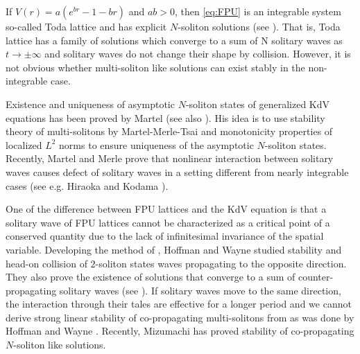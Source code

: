 \documentclass[11pt]{amsart}
\theoremstyle{remark}
\numberwithin{equation}{section}
\begin{document}
\par
If $V(r)=a(e^{br}-1-br)$ and $ab>0$, then  \eqref{eq:FPU} is an integrable
system so-called Toda lattice  and has explicit $N$-soliton solutions
(see \cite{To}).  That is, Toda lattice has a family of solutions which
converge to a sum of N solitary waves as $t\to\pm\infty$ and
solitary waves do not change their shape by collision.
However, it is not obvious whether multi-soliton like solutions can exist
stably in the non-integrable case.
\par
Existence and uniqueness of asymptotic $N$-soliton states of generalized 
KdV equations has been proved by Martel \cite{Ma} (see also \cite{MM1}).
His idea is to use stability theory of multi-solitons by Martel-Merle-Tsai
\cite{MMT} and monotonicity properties of localized  $L^2$ norms to ensure
uniqueness of the asymptotic $N$-soliton states. 
Recently, Martel and Merle \cite{MM2,MM3} prove that nonlinear interaction
between solitary waves causes defect of solitary waves in a setting different
from nearly integrable cases (see e.g. Hiraoka and Kodama \cite{HK}).
\par
One of the difference between FPU lattices and the KdV equation is that a
solitary wave of FPU lattices cannot be characterized as a critical point
of a conserved quantity due to the lack of infinitesimal invariance of the
spatial variable. Developing the method of \cite{FP1,FP2,FP3,FP4},
Hoffman and Wayne \cite{Hoff-Way} studied stability and head-on collision of
$2$-soliton states  waves propagating to the opposite direction.
They also prove the existence of solutions that converge to a sum of
counter-propagating solitary waves (see \cite{Hoff-Way2}).
If solitary waves move to the same direction,
the interaction through their tales are effective for a longer period
and we cannot derive strong linear stability of co-propagating multi-solitons
from \cite{FP3,FP4} as was done by Hoffman and Wayne
\cite{Hoff-Way, Hoff-Way2}. Recently, Mizumachi \cite{Mi2} has proved
stability of co-propagating $N$-soliton like solutions.
\end{document}
